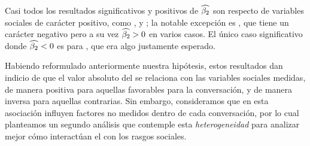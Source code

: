 Casi todos los resultados significativos y positivos de $\widehat{\beta_2}$ son respecto de variables sociales de carácter positivo, como \svclear, \svengaged y \svencourages; la notable excepción es \svdifficult, que tiene un carácter negativo pero a su vez $\widehat{\beta_2} > 0$ en varios casos. El único caso significativo donde $\widehat{\beta_2} < 0$ es para \svbored, que era algo justamente esperado.

Habiendo reformulado anteriormente nuestra hipótesis, estos resultados dan indicio de que el valor absoluto del \entrainment se relaciona con las variables sociales medidas, de manera positiva para aquellas favorables para la conversación, y de manera inversa para aquellas contrarias. Sin embargo, consideramos que en esta asociación influyen factores no medidos dentro de cada conversación, por lo cual planteamos un segundo análisis que contemple esta \emph{heterogeneidad} para analizar mejor cómo interactúan el \entrainment con los rasgos sociales.






